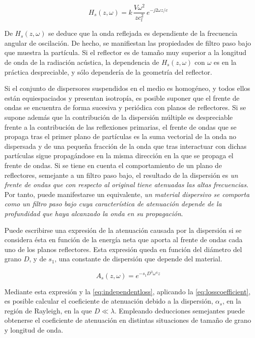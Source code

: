 \begin{equation}
	H_s(z, \omega) = k\,\frac{V\omega^2}{zc^2_l}\,e^{-j2\omega z/c}
	\label{eq:disperser}
\end{equation}

De $H_s(z, \omega)$ se deduce que la onda reflejada es dependiente de la frecuencia angular de oscilación. De hecho, se manifiestan las propiedades de filtro paso bajo que muestra la partícula. Si el reflector es de tamaño muy superior a la longitud de onda de la radiación acústica, la dependencia de $H_s(z, \omega)$ con $\omega$ es en la práctica despreciable, y sólo dependería de la geometría del reflector.\par
Si el conjunto de dispersores suspendidos en el medio es homogéneo, y todos ellos están equiespaciados y presentan isotropía, es posible suponer que el frente de ondas se encuentra de forma sucesiva y periódica con planos de reflectores. Si se supone además que la contribución de la dispersión múltiple es despreciable frente a la contribución de las reflexiones primarias, el frente de ondas que se propaga tras el primer plano de partículas es la suma vectorial de la onda no dispersada y de una pequeña fracción de la onda que tras interactuar con dichas partículas sigue propagándose en la misma dirección en la que se propaga el frente de ondas. Si se tiene en cuenta el comportamiento de un plano de reflectores, semejante a un filtro paso bajo, el resultado de la dispersión es \emph{un frente de ondas que con respecto al original tiene atenuadas las altas frecuencias}. Por tanto, puede manifestarse un equivalente, \emph{un material dispersivo se comporta como un filtro paso bajo cuya característica de atenuación depende de la profundidad que haya alcanzado la onda en su propagación}.\par
Puede escribirse una expresión de la atenuación causada por la dispersión si se considera ésta en función de la energía neta que aporta al frente de ondas cada uno de los planos reflectores. Esta expresión queda en función del diámetro del grano $D$, y de $s_1$, una constante de dispersión que depende del material.

\begin{equation}
	A_s(z, \omega) = e^{-s_1D^3\omega^4z}
	\label{eq:dispersionloss}
\end{equation}

Mediante esta expresión y la \cref{eq:independentloss}, aplicando la \cref{eq:losscoefficient}, es posible calcular el coeficiente de atenuación debido a la dispersión, $\alpha_s$, en la región de Rayleigh, en la que $D\ll\lambda$. Empleando deducciones semejantes puede obtenerse el coeficiente de atenuación en distintas situaciones de tamaño de grano y longitud de onda.

